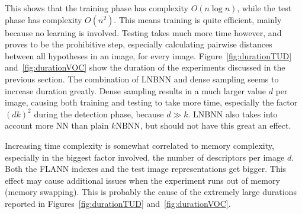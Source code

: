 This shows that the training phase has complexity $O(n\log n)$, while the test phase has complexity $O(n^2)$. This means training is quite efficient, mainly because no learning is involved. Testing takes much more time however, and proves to be the prohibitive step, especially calculating pairwise distances between all hypotheses in an image, for every image. Figure~\ref{fig:durationTUD} and~\ref{fig:durationVOC} show the duration of the experiments discussed in the previous section. The combination of LNBNN and dense sampling seems to increase duration greatly. Dense sampling results in a much larger value $d$ per image, causing both training and testing to take more time, especially the factor $(dk)^2$ during the detection phase, because $d\gg k$. LNBNN also takes into account more NN than plain $k$NBNN, but should not have this great an effect.

Increasing time complexity is somewhat correlated to memory complexity, especially in the biggest factor involved, the number of descriptors per image $d$. Both the FLANN indexes and the test image representations get bigger. This effect may cause additional issues when the experiment runs out of memory (memory swapping). This is probably the cause of the extremely large durations reported in Figures~\ref{fig:durationTUD} and~\ref{fig:durationVOC}.



